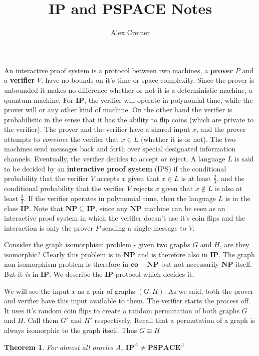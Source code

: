 \documentclass{article}
\title{IP and PSPACE Notes}
\author{Alex Creiner}
\theoremstyle{definition}
\theoremstyle{plain}
\theoremstyle{theorem}
\newtheorem{theorem}{Theorem}[section]
\begin{document}
\maketitle
An interactive proof system is a protocol between two machines, a \textbf{prover} $P$ and a \textbf{verifier} $V$. have no bounds on it's time or space complexity. Since the prover is unbounded it makes no difference whether or not it is a deterministic machine, a quantum machine, For $\bm{IP}$, the verifier will operate in polynomial time, while the prover will or any other kind of machine. On the other hand the verifier is probabilistic in the sense that it has the ability to flip coins (which are private to the verifier). The prover and the verifier have a shared input $x$, and the prover attempts to \textit{convince} the verifier that $x \in L$ (whether it is or not). The two machines send messages back and forth over special designated information channels. Eventually, the verifier decides to accept or reject. A language $L$ is said to be decided by an \textbf{interactive proof system} (IPS) if the conditional probability that the verifier $V$ accepts $x$ given that $x \in L$ is at least $\frac{2}{3}$, and the conditional probability that the verifier $V$ rejects $x$ given that $x \notin L$ is also at least $\frac{2}{3}$. If the verifier operates in polynomial time, then the language $L$ is in the class $\bm{IP}$. Note that $\bm{NP} \subseteq \bm{IP}$, since any $\bm{NP}$ machine can be seen as an interactive proof system in which the verifier doesn't use it's coin flips and the interaction is only the prover $P$ sending a single message to $V$. \par 
Consider the graph isomorphism problem - given two graphs $G$ and $H$, are they isomorphic? Clearly this problem is in $\bm{NP}$ and is therefore also in $\bm{IP}$. The graph non-isomorphism problem is therefore in $\bm{co-NP}$ but not necessarily $\bm{NP}$ itself. But it \textit{is} in $\bm{IP}$. We describe the $\bm{IP}$ protocol which decides it. \par 
We will see the input $x$ as a pair of graphs $(G,H)$. As we said, both the prover and verifier have this input available to them. The verifier starts the process off. It uses it's random coin flips to create a random permutation of both graphs $G$ and $H$. Call them $G'$ and $H'$ respectively. Recall that a permutation of a graph is always isomorphic to the graph itself. Thus $G \cong H$
\begin{theorem}
	For almost all oracles $A$, $\bm{IP}^A \neq \bm{PSPACE}^A$
\end{theorem}
\end{document}
